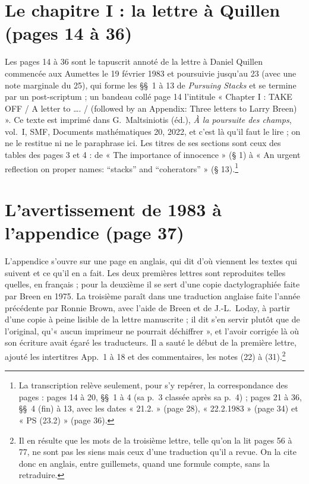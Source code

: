 \documentclass[11pt,a4paper]{article}
\begin{document}
\section*{Le chapitre I : la lettre à Quillen (pages 14 à 36)}

Les pages 14 à 36 sont le tapuscrit annoté de la lettre à Daniel Quillen
commencée aux Aumettes le 19 février 1983 et poursuivie jusqu'au 23 (avec
une note marginale du 25), qui forme les §§~1 à 13 de \emph{Pursuing Stacks}
et se termine par un post-scriptum ; un bandeau collé page 14 l'intitule
« Chapter I : TAKE OFF / A letter to …. / (followed by an Appendix: Three
letters to Larry Breen) ». Ce texte est imprimé dans G.~Maltsiniotis (éd.),
\emph{À la poursuite des champs}, vol.~I, SMF, Documents mathématiques 20,
2022, et c'est là qu'il faut le lire ; on ne le restitue ni ne le paraphrase
ici. Les titres de ses sections sont ceux des tables des pages 3 et 4 : de
« The importance of innocence » (§ 1) à « An urgent reflection on proper
names: “stacks” and “coherators” » (§ 13).\footnote{La transcription relève
seulement, pour s'y repérer, la correspondance des pages : pages 14 à 20,
§§~1 à 4 (sa p.~3 classée après sa p.~4) ; pages 21 à 36, §§~4 (fin) à 13,
avec les dates « 21.2. » (page 28), « 22.2.1983 » (page 34) et « PS (23.2) »
(page 36).}

\section*{L'avertissement de 1983 à l'appendice (page 37)}

L'appendice s'ouvre sur une page en anglais, qui dit d'où viennent les
textes qui suivent et ce qu'il en a fait. Les deux premières lettres sont
reproduites telles quelles, en français ; pour la deuxième il se sert d'une
copie dactylographiée faite par Breen en 1975. La troisième paraît dans une
traduction anglaise faite l'année précédente par Ronnie Brown, avec l'aide
de Breen et de J.-L.~Loday, à partir d'une copie à peine lisible de la
lettre manuscrite ; il dit s'en servir plutôt que de l'original, qu'« aucun
imprimeur ne pourrait déchiffrer », et l'avoir corrigée là où son écriture
avait égaré les traducteurs. Il a sauté le début de la première lettre, ajouté
les intertitres App.~1 à 18 et des commentaires, les notes (22) à
(31).\footnote{Il en résulte que les mots de la troisième lettre, telle
qu'on la lit pages 56 à 77, ne sont pas les siens mais ceux d'une
traduction qu'il a revue. On la cite donc en anglais, entre guillemets,
quand une formule compte, sans la retraduire.}
\end{document}
